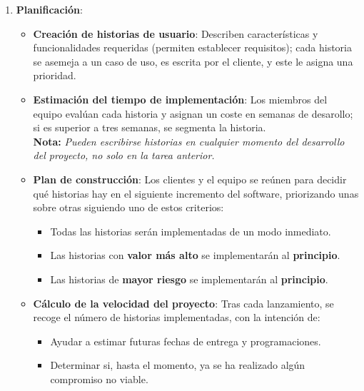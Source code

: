 \begin{enumerate}

   \item \textbf{Planificación}:
         
      \begin{itemize}
            \item \textbf{Creación de historias de usuario}: Describen características y funcionalidades requeridas (permiten establecer requisitos); cada historia se asemeja a un caso de uso, es escrita por el cliente, y este le asigna una prioridad.

            \item \textbf{Estimación del tiempo de implementación}: Los miembros del equipo evalúan cada historia y asignan un coste en semanas de desarollo; si es superior a tres semanas, se segmenta la historia.\\
            
            \textbf{Nota:} \textit{Pueden escribirse historias en cualquier momento del desarrollo del proyecto, no solo en la tarea anterior.}\\

            \item \textbf{Plan de construcción}: Los clientes y el equipo se reúnen para decidir qué historias hay en el siguiente incremento del software, priorizando unas sobre otras siguiendo uno de estos criterios:
                  \begin{itemize}
                     \item Todas las historias serán implementadas de un modo inmediato.
                     \item Las historias con \textbf{valor más alto} se implementarán al \textbf{principio}.
                     \item Las historias de \textbf{mayor riesgo} se implementarán al \textbf{principio}.
                  \end{itemize}

            \item \textbf{Cálculo de la velocidad del proyecto}: Tras cada lanzamiento, se recoge el número de historias implementadas, con la intención de:
                  \begin{itemize}
                     \item Ayudar a estimar futuras fechas de entrega y programaciones.
                     \item Determinar si, hasta el momento, ya se ha realizado algún compromiso no viable.
                  \end{itemize}
         \end{itemize}



\end{enumerate}
